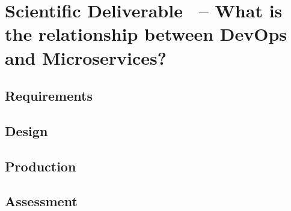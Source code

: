 \section{Scientific Deliverable \thesdel\ -- What is the relationship
between DevOps and Microservices?}
{\color{gray}

\subsection{Requirements}
\subsection{Design}
\subsection{Production}
\subsection{Assessment}
}
